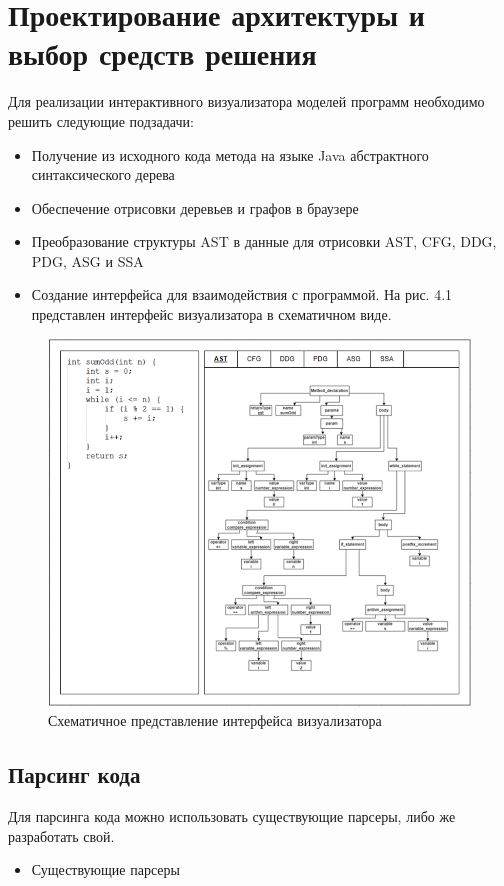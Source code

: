 \chapter{Проектирование архитектуры и выбор средств решения} \label{ch4}
Для реализации интерактивного визуализатора моделей программ необходимо решить следующие подзадачи:
\begin{itemize}
\item Получение из исходного кода метода на языке Java абстрактного синтаксического дерева
\item Обеспечение отрисовки деревьев и графов в браузере
\item Преобразование структуры AST в данные для отрисовки AST, CFG, DDG, PDG, ASG и SSA
\item Создание интерфейса для взаимодействия с программой. На рис. 4.1 представлен интерфейс визуализатора в схематичном виде.
\end{itemize}
\begin{figure}[h]
	\center
	\includegraphics [scale=0.75] {my_folder/images/my/12}
	\caption{Схематичное представление интерфейса визуализатора} 
	\label{fig:12}  
\end{figure}
\section{Парсинг кода} \label{ch4:sec1}
Для парсинга кода можно использовать существующие парсеры, либо же разработать свой.
\begin{itemize}
\item Существующие парсеры
\end{itemize}

